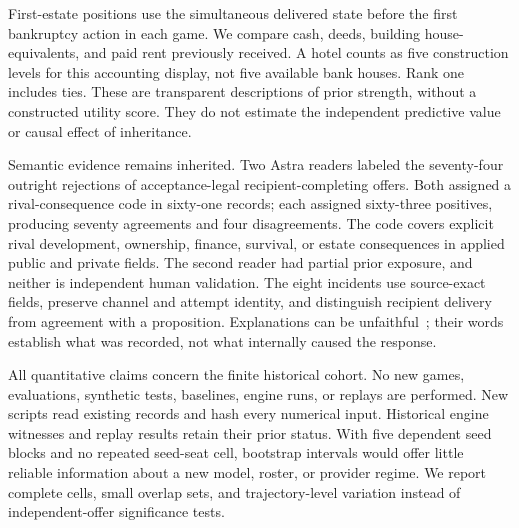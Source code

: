 First-estate positions use the simultaneous delivered state before the first bankruptcy action in each game. We compare cash, deeds, building house-equivalents, and paid rent previously received. A hotel counts as five construction levels for this accounting display, not five available bank houses. Rank one includes ties. These are transparent descriptions of prior strength, without a constructed utility score. They do not estimate the independent predictive value or causal effect of inheritance.

Semantic evidence remains inherited. Two Astra readers labeled the seventy-four outright rejections of acceptance-legal recipient-completing offers. Both assigned a rival-consequence code in sixty-one records; each assigned sixty-three positives, producing seventy agreements and four disagreements. The code covers explicit rival development, ownership, finance, survival, or estate consequences in applied public and private fields. The second reader had partial prior exposure, and neither is independent human validation. The eight incidents use source-exact fields, preserve channel and attempt identity, and distinguish recipient delivery from agreement with a proposition. Explanations can be unfaithful~\cite{turpin2023unfaithful}; their words establish what was recorded, not what internally caused the response.

All quantitative claims concern the finite historical cohort. No new games, evaluations, synthetic tests, baselines, engine runs, or replays are performed. New scripts read existing records and hash every numerical input. Historical engine witnesses and replay results retain their prior status. With five dependent seed blocks and no repeated seed-seat cell, bootstrap intervals would offer little reliable information about a new model, roster, or provider regime. We report complete cells, small overlap sets, and trajectory-level variation instead of independent-offer significance tests.
